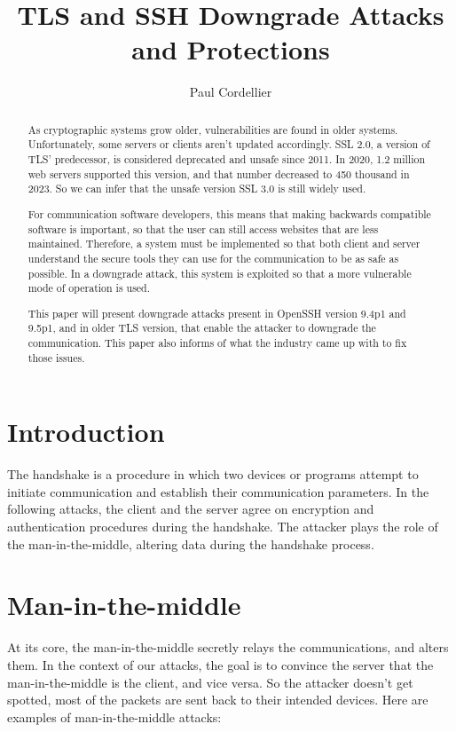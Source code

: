 \documentclass[journal=tches,final]{iacrtrans}
\author{Paul Cordellier}
\institute{
  Hochschule Albstadt-Sigmaringen, Albstadt-Ebingen, Germany, \email{cordellierp@gmail.com}
}
\title{TLS and SSH Downgrade Attacks and Protections}
\begin{document}
\maketitle



\begin{abstract}
  As cryptographic systems grow older, vulnerabilities are found in older systems. Unfortunately, some servers or clients aren't updated accordingly. SSL 2.0, a version of TLS' predecessor, is considered deprecated and unsafe since 2011. In 2020, 1.2 million web servers supported this version, and that number decreased to 450 thousand in 2023. \cite{ssl_stats} So we can infer that the unsafe version SSL 3.0 is still widely used.
  
  For communication software developers, this means that making backwards compatible software is important, so that the user can still access websites that are less maintained. Therefore, a system must be implemented so that both client and server understand the secure tools they can use for the communication to be as safe as possible. In a downgrade attack, this system is exploited so that a more vulnerable mode of operation is used. 
  
  This paper will present downgrade attacks present in OpenSSH version 9.4p1 and 9.5p1, and in older TLS version, that enable the attacker to downgrade the communication. This paper also informs of what the industry came up with to fix those issues. 
\end{abstract}


\section{Introduction}

The handshake is a procedure in which two devices or programs attempt to initiate communication and establish their communication parameters. In the following attacks, the client and the server agree on encryption and authentication procedures during the handshake. The attacker plays the role of the man-in-the-middle, altering data during the handshake process.


\section{Man-in-the-middle}
\label{sec:MitM}

At its core, the man-in-the-middle secretly relays the communications, and alters them. In the context of our attacks, the goal is to convince the server that the man-in-the-middle is the client, and vice versa. So the attacker doesn't get spotted, most of the packets are sent back to their intended devices. Here are examples of man-in-the-middle attacks:
 
\end{document}

